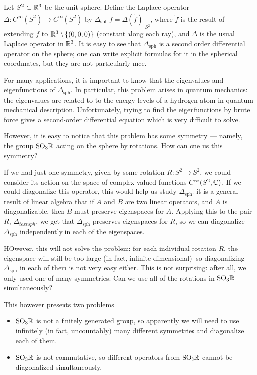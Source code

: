 Let $S^2\subset\mathbb{R}^3$ be the unit sphere. Define the Laplace operator
$\Delta\colon C^\infty(S^2)\to C^\infty(S^2)$ by
$\Delta_{\text{sph}}\,f=\left.\Delta(\tilde f)\right|_{S^2}$, where
$\tilde f$ is the result of extending $f$ to $\mathbb{R}^3\setminus\{(0,0,0)\}$
(constant along each ray), and $\Delta$ is the usual Laplace operator in
$\mathbb{R}^3$. It is easy to see that $\Delta_{\text{sph}}$ is a second order
differential operator on the sphere; one can write explicit formulas for it
in the spherical coordinates, but they are not particularly nice.

For many applications, it is important to know that the eigenvalues and
eigenfunctions of $\Delta_{\text{sph}}$. In particular, this problem arises
in quantum mechanics: the eigenvalues are related to to the energy levels
of a hydrogen atom in quantum mechanical description. Unfortunately, trying
to find the eigenfunctions by brute force gives a second-order differential
equation which is very difficult to solve.

However, it is easy to notice that this problem has some symmetry ---
namely, the group $\mathrm{SO}_3\mathbb{R}$ acting on the sphere by rotations. How can
one us this symmetry?

If we had just one symmetry, given by some rotation $R\colon S^2\to S^2$,
we could consider its action on the space of complex-valued functions
$C^\infty(S^2,\mathbb{C})$. If we could diagonalize this operator, this would
help us study $\Delta_{\text{sph}}$: it is a general result of linear
algebra that if $A$ and $B$ are two linear operators, and $A$ is
diagonalizable, then $B$ must preserve eigenspaces for $A$. Applying this
to the pair $R$, $\Delta_{text{sph}}$, we get that $\Delta_{\text{sph}}$
preserves eigenspaces for $R$, so we can diagonalize $\Delta_{\text{sph}}$
independently in each of the eigenspaces.

HOwever, this will not solve the problem: for each individual rotation $R$,
the eigenspace will still be too large (in fact, infinite-dimensional), so
diagonalizing $\Delta_{\text{sph}}$ in each of them is not very easy
either. This is not surprising: after all, we only used one of many
symmetries. Can we use all of the rotations in $\mathrm{SO}_3\mathbb{R}$ simultaneously?

This however presents two problems
\begin{itemize}
\item $\mathrm{SO}_3\mathbb{R}$ is not a finitely generated group, so apparently we will
  need to use infinitely (in fact, uncountably) many different symmetries
  and diagonalize each of them.
\item $\mathrm{SO}_3\mathbb{R}$ is not commutative, so different operators from
  $\mathrm{SO}_3\mathbb{R}$ cannot be diagonalized simultaneously.
\end{itemize}

